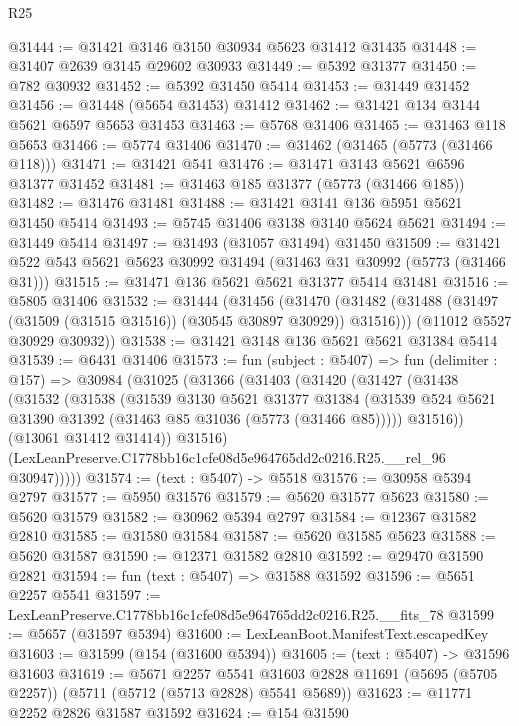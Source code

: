 \begin{lexlean}{R25}
\begin{coremodule}
@31444 := @31421 @3146 @3150 @30934 @5623 @31412 @31435
@31448 := @31407 @2639 @3145 @29602 @30933
@31449 := @5392 @31377
@31450 := @782 @30932
@31452 := @5392 @31450 @5414
@31453 := @31449 @31452
@31456 := @31448 (@5654 @31453) @31412
@31462 := @31421 @134 @3144 @5621 @6597 @5653 @31453
@31463 := @5768 @31406
@31465 := @31463 @118 @5653
@31466 := @5774 @31406
@31470 := @31462 (@31465 (@5773 (@31466 @118)))
@31471 := @31421 @541
@31476 := @31471 @3143 @5621 @6596 @31377 @31452
@31481 := @31463 @185 @31377 (@5773 (@31466 @185))
@31482 := @31476 @31481
@31488 := @31421 @3141 @136 @5951 @5621 @31450 @5414
@31493 := @5745 @31406 @3138 @3140 @5624 @5621
@31494 := @31449 @5414
@31497 := @31493 (@31057 @31494) @31450
@31509 := @31421 @522 @543 @5621 @5623 @30992 @31494 (@31463 @31 @30992 (@5773 (@31466 @31)))
@31515 := @31471 @136 @5621 @5621 @31377 @5414 @31481
@31516 := @5805 @31406
@31532 := @31444
    (@31456
      (@31470 (@31482 (@31488 (@31497 (@31509 (@31515 @31516)) (@30545 @30897 @30929)) @31516)))
      (@11012 @5527 @30929 @30932))
@31538 := @31421 @3148 @136 @5621 @5621 @31384 @5414
@31539 := @6431 @31406
@31573 := fun (subject : @5407) =>
  fun (delimiter : @157) =>
  @30984
    (@31025
      (@31366
        (@31403
          (@31420
            (@31427
              (@31438
                (@31532
                  (@31538
                    (@31539
                      @3130
                      @5621
                      @31377
                      @31384
                      (@31539 @524 @5621 @31390 @31392 (@31463 @85 @31036 (@5773 (@31466 @85)))))
                    @31516))
                (@13061 @31412 @31414))
              @31516)
            (LexLeanPreserve.C1778bb16c1cfe08d5e964765dd2c0216.R25.__rel_96 @30947)))))
@31574 := (text : @5407) -> @5518
@31576 := @30958 @5394 @2797
@31577 := @5950 @31576
@31579 := @5620 @31577 @5623
@31580 := @5620 @31579
@31582 := @30962 @5394 @2797
@31584 := @12367 @31582 @2810
@31585 := @31580 @31584
@31587 := @5620 @31585 @5623
@31588 := @5620 @31587
@31590 := @12371 @31582 @2810
@31592 := @29470 @31590 @2821
@31594 := fun (text : @5407) => @31588 @31592
@31596 := @5651 @2257 @5541
@31597 := LexLeanPreserve.C1778bb16c1cfe08d5e964765dd2c0216.R25.__fits_78
@31599 := @5657 (@31597 @5394)
@31600 := LexLeanBoot.ManifestText.escapedKey
@31603 := @31599 (@154 (@31600 @5394))
@31605 := (text : @5407) -> @31596 @31603
@31619 := @5671
    @2257
    @5541
    @31603
    @2828
    @11691
    (@5695 (@5705 @2257))
    (@5711 (@5712 (@5713 @2828) @5541 @5689))
@31623 := @11771 @2252 @2826 @31587 @31592
@31624 := @154 @31590

\end{coremodule}
\end{lexlean}
